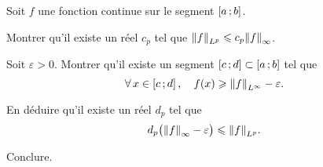 \begin{exercice}
Soit $f$ une fonction continue sur le segment $\left[a\,;b\right]$.
\begin{questions}
\item Montrer qu'il existe un réel $c_p$ tel que $\norm{f}_{L^p} \leqslant c_p \norm{f}_\infty$.

\item Soit $\varepsilon > 0$. Montrer qu'il existe un segment $\left[c\,;d\right] \subset \left[a\,;b\right]$ tel que
\[
\forall x \in \interff{c}{d},\quad f(x) \geqslant \norm{f}_{L^\infty} - \varepsilon.
\]

\item En déduire qu'il existe un réel $d_p$ tel que
\[
d_p \big(\norm{f}_\infty - \varepsilon\big) \leqslant \norm{f}_{L^p}.
\]

\item Conclure.
\end{questions}
\end{exercice}

\begin{marginfigure}[-5cm]
    \centering
    
    \caption{$\fonctionligne[f]{x}{x^2\sin(10x)+1}$}
\end{marginfigure}

